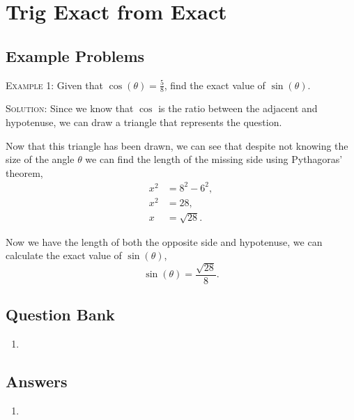 \documentclass[a4paper,12pt]{article}
\begin{document}
\large
\section*{Trig Exact from Exact}

\subsection*{Example Problems}

\textsc{Example 1}: Given that $\cos(\theta) = \frac{5}{8}$, 
find the exact value of $\sin(\theta)$.

\textsc{Solution}: Since we know that $\cos$ is the 
ratio between the adjacent and hypotenuse, we can draw
a triangle that represents the question.

\begin{figure}[h]
\centering
{}
\end{figure}

Now that this triangle has been drawn, we can see that
despite not knowing the size of the angle $\theta$ we
can find the length of the missing side using Pythagoras'
theorem,
\begin{align*}
x^2 &= 8^2 - 6^2, \\
x^2 &= 28, \\
x &= \sqrt{28}.
\end{align*}

\begin{figure}[h]
\centering
{}
\end{figure}

Now we have the length of both the opposite side and 
hypotenuse, we can calculate the exact value of 
$\sin(\theta)$,
$$\sin(\theta) = \frac{\sqrt{28}}{8}.$$

\newpage
\subsection*{Question Bank}

\begin{enumerate}
\item 
\end{enumerate}

\newpage
\subsection*{Answers}

\begin{enumerate}
\item 
\end{enumerate}
\end{document}
